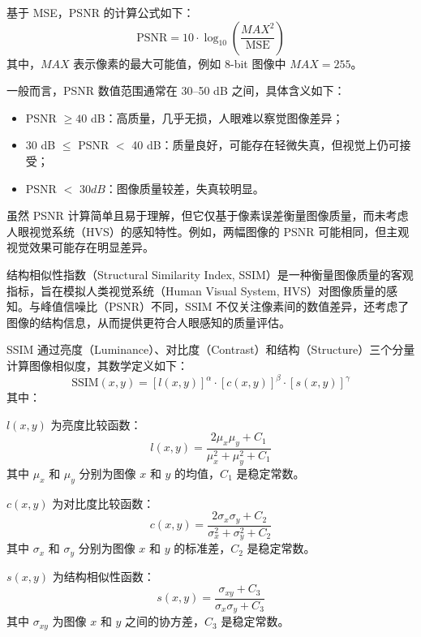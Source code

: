 基于 MSE，PSNR 的计算公式如下：
\begin{equation}
    \text{PSNR} = 10 \cdot \log_{10} \left( \frac{MAX^2}{\text{MSE}} \right)
\end{equation}
其中，$MAX$ 表示像素的最大可能值，例如 8-bit 图像中 $MAX = 255$。

一般而言，PSNR 数值范围通常在 30–50 dB 之间，具体含义如下：
\begin{itemize}
    \item PSNR $\geq 40$ dB：高质量，几乎无损，人眼难以察觉图像差异；
    \item 30 dB $\leq$ PSNR $<$ 40 dB：质量良好，可能存在轻微失真，但视觉上仍可接受；
    \item PSNR $<$ 30$ dB$：图像质量较差，失真较明显。
\end{itemize}

虽然 PSNR 计算简单且易于理解，但它仅基于像素误差衡量图像质量，而未考虑人眼视觉系统（HVS）的感知特性。例如，两幅图像的 PSNR 可能相同，但主观视觉效果可能存在明显差异。

结构相似性指数（Structural Similarity Index, SSIM）是一种衡量图像质量的客观指标，旨在模拟人类视觉系统（Human Visual System, HVS）对图像质量的感知。与峰值信噪比（PSNR）不同，SSIM 不仅关注像素间的数值差异，还考虑了图像的结构信息，从而提供更符合人眼感知的质量评估。

SSIM 通过亮度（Luminance）、对比度（Contrast）和结构（Structure）三个分量计算图像相似度，其数学定义如下：
\begin{equation}
\text{SSIM}(x, y) = [l(x, y)]^\alpha \cdot [c(x, y)]^\beta \cdot [s(x, y)]^\gamma
\end{equation}
其中：

$l(x, y)$ 为亮度比较函数：
\begin{equation}
l(x, y) = \frac{2\mu_x\mu_y + C_1}{\mu_x^2 + \mu_y^2 + C_1}
\end{equation}
其中 $\mu_x$ 和 $\mu_y$ 分别为图像 $x$ 和 $y$ 的均值，$C_1$ 是稳定常数。

$c(x, y)$ 为对比度比较函数：
\begin{equation}
c(x, y) = \frac{2\sigma_x\sigma_y + C_2}{\sigma_x^2 + \sigma_y^2 + C_2}
\end{equation}
其中 $\sigma_x$ 和 $\sigma_y$ 分别为图像 $x$ 和 $y$ 的标准差，$C_2$ 是稳定常数。

$s(x, y)$ 为结构相似性函数：
\begin{equation}
s(x, y) = \frac{\sigma_{xy} + C_3}{\sigma_x \sigma_y + C_3}
\end{equation}
其中 $\sigma_{xy}$ 为图像 $x$ 和 $y$ 之间的协方差，$C_3$ 是稳定常数。



